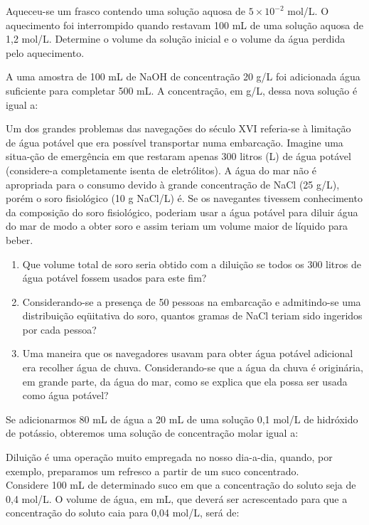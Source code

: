\documentclass[a4paper,12]{exam}
\begin{document}
\begin{multicols}{2}
\begin{questions}
	\question Aqueceu-se um frasco contendo uma solução aquosa de  $5 \times 10^{-2}$ mol/L. O aquecimento foi interrompido quando restavam 100 mL de uma solução aquosa de  1,2 mol/L. Determine o volume da solução inicial e o volume da água perdida pelo aquecimento. \makeemptybox{2cm}

	\question A uma amostra de 100 mL de NaOH de concentração 20 g/L foi adicionada água suficiente para completar 500 mL. A concentração, em g/L, dessa nova solução é igual a: \makeemptybox{2cm}

	\question Um dos grandes problemas das navegações do século XVI referia-se à limitação de água potável que era possível transportar numa embarcação. Imagine uma situa-ção de emergência em que restaram apenas 300 litros (L) de água potável (considere-a completamente isenta de eletrólitos). A água do mar não é apropriada para o consumo devido à grande concentração de NaCl (25 g/L), porém o soro fisiológico (10 g NaCl/L) é. Se os navegantes tivessem conhecimento da composição do soro fisiológico, poderiam usar a água potável para diluir água do mar de modo a obter soro e assim teriam um volume maior de líquido para beber.
		\begin{enumerate}[label=\alph*)]
			\item Que volume total de soro seria obtido com a diluição se todos os 300 litros de água potável fossem usados para este fim?
			\item Considerando-se a presença de 50 pessoas na embarcação e admitindo-se uma distribuição eqüitativa do soro, quantos gramas de NaCl teriam sido ingeridos por
cada pessoa?
			\item Uma maneira que os navegadores usavam para obter água potável adicional era recolher água de chuva. Considerando-se que a água da chuva é originária, em grande parte, da água do mar, como se explica que ela possa ser usada como água potável?
		\end{enumerate}

		\question Se adicionarmos 80 mL de água a 20 mL de uma solução 0,1 mol/L de hidróxido de potássio, obteremos uma solução de concentração molar igual a:\makeemptybox{2cm}

		\question Diluição é uma operação muito empregada no nosso dia-a-dia, quando, por exemplo, preparamos um refresco a partir de um suco concentrado. \\
		Considere 100 mL de determinado suco em que a concentração do soluto seja de 0,4 mol/L. O volume de água, em mL, que deverá ser acrescentado para que a concentração do soluto caia para 0,04 mol/L, será de: \makeemptybox{2cm}




	 \end{questions}
\end{multicols}
\end{document}
